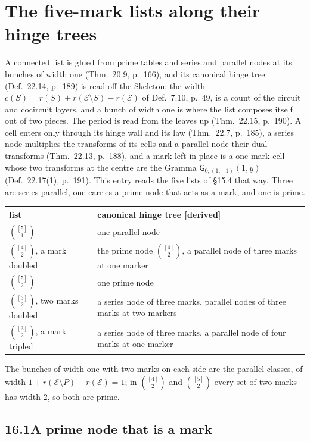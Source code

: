 \documentclass[11pt]{article}
\newcommand{\cE}{\mathcal E}
\newcommand{\sG}{\mathsf G}
\theoremstyle{plain}
\theoremstyle{definition}
\theoremstyle{remark}
\renewcommand{\thesection}{15}
\renewcommand{\theproposition}{15.\arabic{proposition}}
\newcommand{\derived}{\textup{[derived]}}
\begin{document}
\renewcommand{\thesection}{16}
\setcounter{proposition}{0}
\renewcommand{\theproposition}{16.\arabic{proposition}}

\section{The five-mark lists along their hinge trees}

A connected list is glued from prime tables and series and parallel nodes at its bunches of width one (Thm.~20.9, p.~166), and its canonical hinge tree (Def.~22.14, p.~189) is read off the Skeleton: the width $c(S)=r(S)+r(\cE\setminus S)-r(\cE)$ of Def.~7.10, p.~49, is a count of the circuit and cocircuit layers, and a bunch of width one is where the list composes itself out of two pieces. The period is read from the leaves up (Thm.~22.15, p.~190). A cell enters only through its hinge wall and its law (Thm.~22.7, p.~185), a series node multiplies the transforms of its cells and a parallel node their dual transforms (Thm.~22.13, p.~188), and a mark left in place is a one-mark cell whose two transforms at the centre are the Gramma $\sG_{0;(1,-1)}(1,y)$ (Def.~22.17(1), p.~191). This entry reads the five lists of \S15.4 that way. Three are series-parallel, one carries a prime node that acts as a mark, and one is prime.

\begin{center}
\small
\begin{tabular}{@{}l l@{}}
\toprule
list & canonical hinge tree \derived\\ \midrule
$\binom{[5]}1$ & one parallel node\\
$\binom{[4]}2$, a mark doubled & the prime node $\binom{[4]}2$, a parallel node of three marks at one marker\\
$\binom{[5]}2$ & one prime node\\
$\binom{[3]}2$, two marks doubled & a series node of three marks, parallel nodes of three marks at two markers\\
$\binom{[3]}2$, a mark tripled & a series node of three marks, a parallel node of four marks at one marker\\
\bottomrule
\end{tabular}
\end{center}
The bunches of width one with two marks on each side are the parallel classes, of width $1+r(\cE\setminus P)-r(\cE)=1$; in $\binom{[4]}2$ and $\binom{[5]}2$ every set of two marks has width $2$, so both are prime.

\subsection*{16.1\quad A prime node that is a mark}
\end{document}
